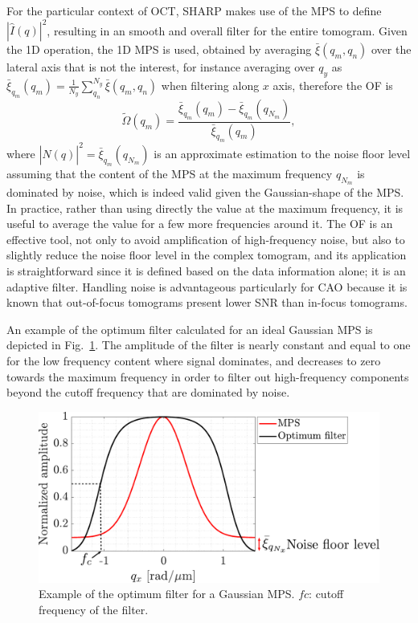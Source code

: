 For the particular context of OCT, SHARP makes use of the MPS to define $|\hat{I}(q)|^2$, resulting in an smooth and overall filter for the entire tomogram. Given the 1D operation, the 1D MPS is used, obtained by averaging $\bar{\xi}(q_m,q_n)$ over the lateral axis that is not the interest, for instance averaging over $q_y$ as $\bar{\xi}_{q_m}(q_m) = \frac{1}{N_y}\sum_{q_n}^{N_y}\bar{\xi}(q_m,q_n)$ when filtering along $x$ axis, therefore the OF is
\begin{equation}
    \tilde{\Omega}(q_m) = \frac{\bar{\xi}_{q_m}(q_m) - \bar{\xi}_{q_m}(q_{N_m})}{\bar{\xi}_{q_m}(q_m)},
\end{equation}
where $|\hat{N}(q)|^2 = \bar{\xi}_{q_m}(q_{N_m})$ is an approximate estimation to the noise floor level assuming that the content of the MPS at the maximum frequency $q_{N_m}$ is dominated by noise, which is indeed valid given the Gaussian-shape of the MPS. In practice, rather than using directly the value at the maximum frequency, it is useful to average the value for a few more frequencies around it. The OF is an effective tool, not only to avoid amplification of high-frequency noise, but also to slightly reduce the noise floor level in the complex tomogram, and its application is straightforward since it is defined based on the data information alone; it is an adaptive filter. Handling noise is advantageous particularly for CAO because it is known that out-of-focus tomograms present lower SNR than in-focus tomograms. 

An example of the optimum filter calculated for an ideal Gaussian MPS is depicted in Fig.~\ref{fig:OptimumFilter}. The amplitude of the filter is nearly constant and equal to one for the low frequency content where signal dominates, and decreases to zero towards the maximum frequency in order to filter out high-frequency components beyond the cutoff frequency that are dominated by noise.

\begin{figure}[htb!]
	\centering
	\includegraphics[width=.7\textwidth]{Figures/SHARP/OptimumFilterExample.pdf}
	\caption[Example of the optimum filter for a Gaussian MPS.]{Example of the optimum filter for a Gaussian MPS. $fc$: cutoff frequency of the filter.}
	\label{fig:OptimumFilter}
\end{figure}

